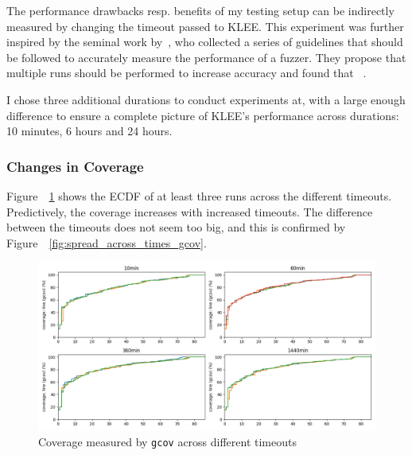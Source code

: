 \documentclass{article}
\let\savedCite=\cite
\renewcommand{\cite}{\unskip~\savedCite}
\let\savedRef=\ref
\renewcommand{\ref}{\unskip~\savedRef}
\begin{document}
The performance drawbacks resp. benefits of my testing setup can be indirectly measured by changing the timeout passed to KLEE. This experiment was further inspired by the seminal work by~\citeauthor{EvaluatingFuzzTesting}, who collected a series of guidelines that should be followed to accurately measure the performance of a fuzzer. They propose that multiple runs should be performed to increase accuracy and found that \cite{EvaluatingFuzzTesting}.

I chose three additional durations to conduct experiments at, with a large enough difference to ensure a complete picture of KLEE's performance across durations: 10 minutes, 6 hours and 24 hours.

\subsubsection{Changes in Coverage}

Figure~\ref{fig:ecdf_across_times} shows the ECDF of at least three runs across the different timeouts. Predictively, the coverage increases with increased timeouts. The difference between the timeouts does not seem too big, and this is confirmed by Figure~\ref{fig:spread_across_times_gcov}.

\begin{figure}[htbp]
    \centering
    \includegraphics[width=1\textwidth]{../plots/gcov_cov/ecdf_by_time.png}
    \caption{Coverage measured by \lstinline{gcov} across different timeouts}
    \label{fig:ecdf_across_times}
\end{figure}
\end{document}
